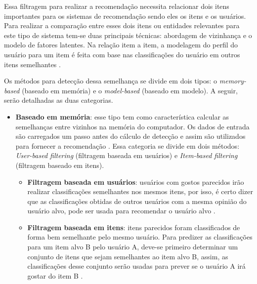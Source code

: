 Essa filtragem para realizar a recomendação necessita relacionar dois itens importantes para os sistemas de recomendação sendo eles os itens e os usuários. Para realizar a comparação entre esses dois itens ou entidades relevantes para este tipo de sistema tem-se duas principais técnicas: abordagem de vizinhança e o modelo de fatores latentes. Na relação item a item, a modelagem do perfil do usuário para um item é feita com base nas classificações do usuário em outros itens semelhantes \cite{Koren:2015}.

Os métodos para detecção dessa semelhança se divide em dois tipos: o \textit{memory-based} (baseado em memória) e o \textit{model-based} (baseado em modelo). A seguir, serão detalhadas as duas categorias.


\begin{itemize}
    \item \textbf{Baseado em memória}: esse tipo tem como característica calcular as semelhanças entre vizinhos na memória do computador. Os dados de entrada são carregados um passo antes do cálculo de detecção e assim são utilizados para fornecer a recomendação \cite{Levinas2014AnAO}. Essa categoria se divide em dois métodos: \textit{User-based filtering} (filtragem baseada em usuários) e \textit{Item-based filtering} (filtragem baseado em itens). 
    \begin{itemize}
        \item \textbf{Filtragem baseada em usuários}: usuários com gostos parecidos irão realizar classificações semelhantes nos mesmos itens, por isso, é certo dizer que as classificações obtidas de outros usuários com a mesma opinião do usuário alvo, pode ser usada para recomendar o usuário alvo \cite{Cimini:2019}.
        \item \textbf{Filtragem baseada em itens}: itens parecidos foram classificados de forma bem semelhante pelo mesmo usuário. Para predizer as classificações para um item alvo B pelo usuário A, deve-se primeiro determinar um conjunto de itens que sejam semelhantes ao item alvo B, assim, as classificações desse conjunto serão usadas para prever se o usuário A irá gostar do item B \cite{Cimini:2019}.
    \end{itemize}
         
\end{itemize}

